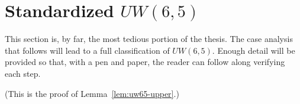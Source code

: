 

\section[Standardized \texorpdfstring{$UW(6,5)$}{UW(6,5)}]{Standardized \texorpdfstring{$UW(6,5)$}{UW(6,5)}}
\label{app:uw65}

This section is, by far, the most tedious portion of the thesis. The case analysis that follows will lead to a full classification of $UW(6,5)$. Enough detail will be provided so that, with a pen and paper, the reader can follow along verifying each step.


\newcommand{\ipr}[2]{$\langle r_{#1} , r_{#2} \rangle$}
\newcommand{\ipc}[2]{$\langle c_{#1} , c_{#2} \rangle$}
\newcommand{\iprz}[2]{$\langle r_{#1} , r_{#2} \rangle = 0$}
\newcommand{\ipcz}[2]{$\langle c_{#1} , c_{#2} \rangle = 0$}

(This is the proof of Lemma~\ref{lem:uw65-upper}.)

